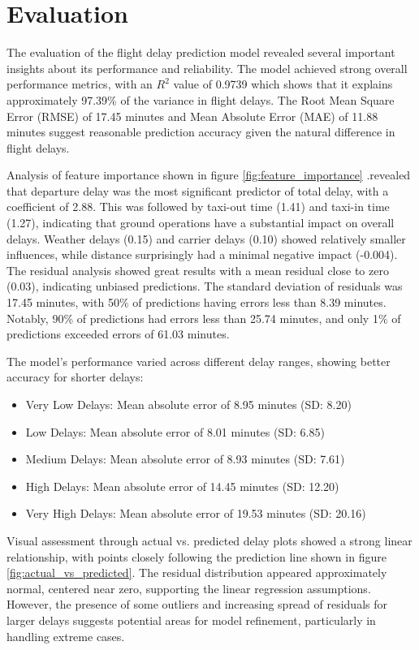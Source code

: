 \section{Evaluation}
The evaluation of the flight delay prediction model revealed several important insights about its performance and reliability. 
The model achieved strong overall performance metrics, with an $R^2$ value of 0.9739 which shows that it explains approximately 97.39\% of the variance in flight delays. 
The Root Mean Square Error (RMSE) of 17.45 minutes and Mean Absolute Error (MAE) of 11.88 minutes suggest reasonable prediction accuracy given the natural difference in flight delays.

Analysis of feature importance shown in figure \ref{fig:feature_importance} .revealed that departure delay was the most significant predictor of total delay, with a coefficient of 2.88. 
This was followed by taxi-out time (1.41) and taxi-in time (1.27), indicating that ground operations have a substantial impact on overall delays. 
Weather delays (0.15) and carrier delays (0.10) showed relatively smaller influences, while distance surprisingly had a minimal negative impact (-0.004).
The residual analysis showed great results with a mean residual close to zero (0.03), indicating unbiased predictions. 
The standard deviation of residuals was 17.45 minutes, with 50\% of predictions having errors less than 8.39 minutes. 
Notably, 90\% of predictions had errors less than 25.74 minutes, and only 1\% of predictions exceeded errors of 61.03 minutes.

The model's performance varied across different delay ranges, showing better accuracy for shorter delays:

\begin{itemize}
\item Very Low Delays: Mean absolute error of 8.95 minutes (SD: 8.20)
\item Low Delays: Mean absolute error of 8.01 minutes (SD: 6.85)
\item Medium Delays: Mean absolute error of 8.93 minutes (SD: 7.61)
\item High Delays: Mean absolute error of 14.45 minutes (SD: 12.20)
\item Very High Delays: Mean absolute error of 19.53 minutes (SD: 20.16)
\end{itemize}


Visual assessment through actual vs. predicted delay plots showed a strong linear relationship, with points closely following the prediction line shown in figure \ref{fig:actual_vs_predicted}. The residual distribution appeared approximately normal, centered near zero, supporting the linear regression assumptions. However, the presence of some outliers and increasing spread of residuals for larger delays suggests potential areas for model refinement, particularly in handling extreme cases.

